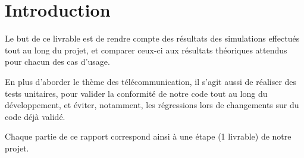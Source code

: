 \section*{Introduction}

Le but de ce livrable est de rendre compte des résultats des simulations effectués tout au long du projet, et comparer ceux-ci aux résultats théoriques attendus pour chacun des cas d'usage.

En plus d'aborder le thème des télécommunication, il s'agit aussi de réaliser des tests unitaires, pour valider la conformité de notre code tout au long du développement, et éviter, notamment, les régressions lors de changements sur du code déjà validé.

Chaque partie de ce rapport correspond ainsi à une étape (1 livrable) de notre projet.